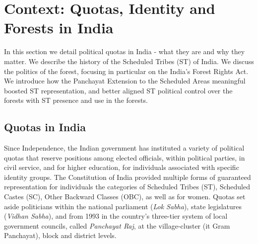 \documentclass[12pt,reqno]{article}
\begin{document}
%


\section{Context: Quotas, Identity and Forests in India} \label{sec:context}




    
    
    
    
    
    

In this section we detail political quotas in India - what they are and why they matter. We describe the history of the Scheduled Tribes (ST) of India. We discuss the politics of the forest, focusing in particular on the India's Forest Rights Act. We introduce how the Panchayat Extension to the Scheduled Areas meaningful boosted ST representation, and better aligned ST political control over the forests with ST presence and use in the forests. 

\subsection{Quotas in India}

Since Independence, the Indian government has instituted a variety of political quotas that reserve positions among elected officials, within political parties, in civil service, and for higher education, for individuals associated with specific identity groups. The  Constitution of India provided multiple forms of guaranteed representation for individuals the categories of Scheduled Tribes (ST), Scheduled Castes (SC), Other Backward Classes (OBC), as well as for women. Quotas set aside politicians within the national parliament ({\it Lok Sabha}), state legislatures ({\it Vidhan Sabha}), and from 1993 in the country's three-tier system of local government councils, called \emph{Panchayat Raj}, at the village-cluster ({it Gram Panchayat}), block and district levels.
\end{document}
